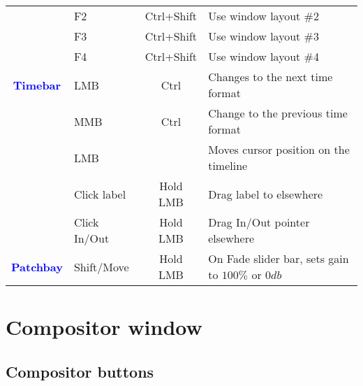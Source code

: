 \begin{center}
\begin{longtable}{ >{\bfseries}c l c p{6cm}}
        & F2 & Ctrl+Shift & Use window layout \#2 \\        
        & F3 & Ctrl+Shift & Use window layout \#3 \\        
        & F4 & Ctrl+Shift & Use window layout \#4 \\
        \midrule
        \textcolor{blue}{Timebar} & LMB & Ctrl & Changes to the next time format \\        
        & MMB & Ctrl & Change to the previous time format \\        
        & LMB &  & Moves cursor position on the timeline \\        
        & Click label & Hold LMB & Drag label to elsewhere \\        
        & Click In/Out & Hold LMB & Drag In/Out pointer elsewhere \\
        \midrule
        \textcolor{blue}{Patchbay} & Shift/Move & Hold LMB & On Fade slider bar, sets gain to $100\%$ or $0db$ \\
        
        \bottomrule  
    \end{longtable}
\end{center}

\section{Compositor window }%
\label{sec:compositor_window_shortcuts}

\subsection{Compositor buttons }%
\label{ssec:compositor_buttons}


